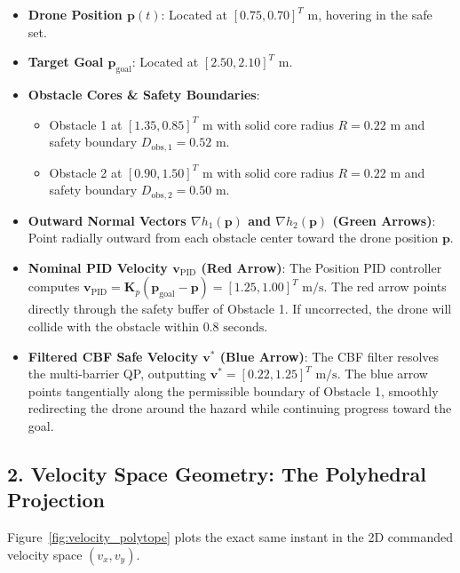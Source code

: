 \documentclass[11pt,a4paper]{article}
\begin{document}
\begin{vectorbox}
\begin{itemize}
    \item \textbf{Drone Position $\mathbf{p}(t)$}: Located at $[0.75, 0.70]^T\text{ m}$, hovering in the safe set.
    \item \textbf{Target Goal $\mathbf{p}_{\mathrm{goal}}$}: Located at $[2.50, 2.10]^T\text{ m}$.
    \item \textbf{Obstacle Cores \& Safety Boundaries}:
    \begin{itemize}
        \item Obstacle 1 at $[1.35, 0.85]^T\text{ m}$ with solid core radius $R = 0.22\text{ m}$ and safety boundary $D_{\mathrm{obs}, 1} = 0.52\text{ m}$.
        \item Obstacle 2 at $[0.90, 1.50]^T\text{ m}$ with solid core radius $R = 0.22\text{ m}$ and safety boundary $D_{\mathrm{obs}, 2} = 0.50\text{ m}$.
    \end{itemize}
    \item \textbf{Outward Normal Vectors $\nabla h_1(\mathbf{p})$ and $\nabla h_2(\mathbf{p})$ (Green Arrows)}:
    Point radially outward from each obstacle center toward the drone position $\mathbf{p}$.
    \item \textbf{Nominal PID Velocity $\mathbf{v}_{\mathrm{PID}}$ (Red Arrow)}:
    The Position PID controller computes $\mathbf{v}_{\mathrm{PID}} = \mathbf{K}_p (\mathbf{p}_{\mathrm{goal}} - \mathbf{p}) = [1.25, 1.00]^T\text{ m/s}$. The red arrow points directly through the safety buffer of Obstacle 1. If uncorrected, the drone will collide with the obstacle within $0.8\text{ seconds}$.
    \item \textbf{Filtered CBF Safe Velocity $\mathbf{v}^*$ (Blue Arrow)}:
    The CBF filter resolves the multi-barrier QP, outputting $\mathbf{v}^* = [0.22, 1.25]^T\text{ m/s}$. The blue arrow points tangentially along the permissible boundary of Obstacle 1, smoothly redirecting the drone around the hazard while continuing progress toward the goal.
\end{itemize}
\end{vectorbox}

\subsection{2. Velocity Space Geometry: The Polyhedral Projection}

Figure~\ref{fig:velocity_polytope} plots the exact same instant in the 2D commanded velocity space $(v_x, v_y)$.
\end{document}
